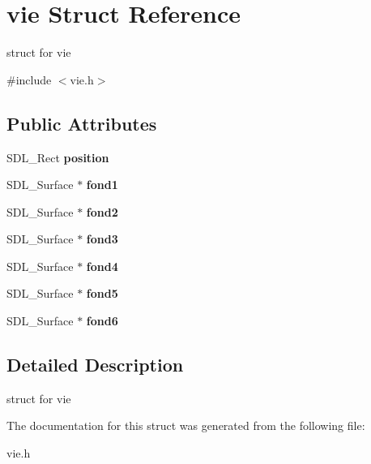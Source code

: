 \hypertarget{structvie}{}\section{vie Struct Reference}
\label{structvie}


struct for vie  




{\ttfamily \#include $<$vie.\+h$>$}

\subsection*{Public Attributes}
\begin{DoxyCompactItemize}
\item 
\mbox{\label{structvie_a916050892cf1e7b8039952dcafa44825}} 
S\+D\+L\+\_\+\+Rect {\bfseries position}
\item 
\mbox{\label{structvie_a7616ae8ecc97b7fb2d92be6a858014ad}} 
S\+D\+L\+\_\+\+Surface $\ast$ {\bfseries fond1}
\item 
\mbox{\label{structvie_a6ecad7f4161cb602faa27d2de9e3ee50}} 
S\+D\+L\+\_\+\+Surface $\ast$ {\bfseries fond2}
\item 
\mbox{\label{structvie_a9763ef794bb12262f5826b911d20e42b}} 
S\+D\+L\+\_\+\+Surface $\ast$ {\bfseries fond3}
\item 
\mbox{\label{structvie_a0b08072b8c7ec9e1adfd6e26b4fcb39f}} 
S\+D\+L\+\_\+\+Surface $\ast$ {\bfseries fond4}
\item 
\mbox{\label{structvie_adabeccdf7e33dd53ac6d85a24fc3931d}} 
S\+D\+L\+\_\+\+Surface $\ast$ {\bfseries fond5}
\item 
\mbox{\label{structvie_afe9825545f1294799e27a037803d79b0}} 
S\+D\+L\+\_\+\+Surface $\ast$ {\bfseries fond6}
\end{DoxyCompactItemize}


\subsection{Detailed Description}
struct for vie 

The documentation for this struct was generated from the following file\+:\begin{DoxyCompactItemize}
\item 
vie.\+h\end{DoxyCompactItemize}
